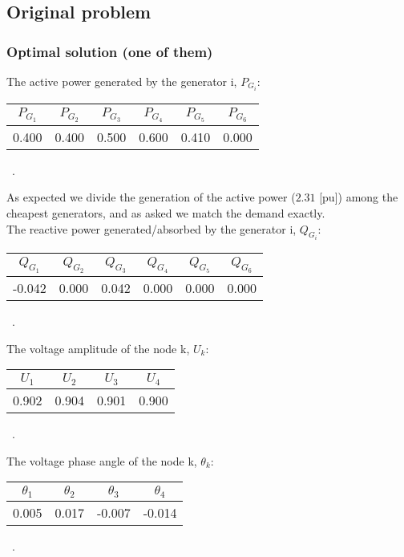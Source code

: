 \subsection{Original problem}

\subsubsection*{Optimal solution (one of them)}

The active power generated by the generator i, $P_{G_i}$: 

\begin{table}[!h]
    \centering
\begin{tabular}{|c|c|c|c|c|c|}
  \hline
  $P_{G_1}$ & $P_{G_2}$ & $P_{G_3}$ & $P_{G_4}$ & $P_{G_5}$ & $P_{G_6}$ \\
  \hline
  0.400 & 0.400 & 0.500 & 0.600 & 0.410 & 0.000 \\
  \hline
\end{tabular} \ .
\end{table}
\noindent
As expected we divide the generation of the active power ($2.31$ [pu]) among the cheapest generators, and as asked we match the demand exactly.\\

The reactive power generated/absorbed by the generator i, $Q_{G_i}$:
\begin{table}[!h]
    \centering
\begin{tabular}{|c|c|c|c|c|c|}
  \hline
  $Q_{G_1}$ & $Q_{G_2}$ & $Q_{G_3}$ & $Q_{G_4}$ & $Q_{G_5}$ & $Q_{G_6}$ \\
  \hline
  -0.042 & 0.000 & 0.042 & 0.000 & 0.000 & 0.000 \\
  \hline
\end{tabular} \ .
\end{table}

\noindent
The voltage amplitude of the node k, $U_k$:

\begin{table}[!h]
    \centering
\begin{tabular}{|c|c|c|c|}
  \hline
  $U_{1}$ & $U_{2}$ & $U_{3}$ & $U_{4}$ \\
  \hline
  0.902 & 0.904 & 0.901 & 0.900 \\
  \hline
\end{tabular} \ .
\end{table}

\noindent
The voltage phase angle of the node k, $\theta_k$:

\begin{table}[!h]
    \centering
\begin{tabular}{|c|c|c|c|}
  \hline
  $\theta_{1}$ & $\theta_{2}$ & $\theta_{3}$ & $\theta_{4}$ \\
  \hline
  0.005 & 0.017 & -0.007 & -0.014 \\
  \hline
\end{tabular} \ .
\end{table}

